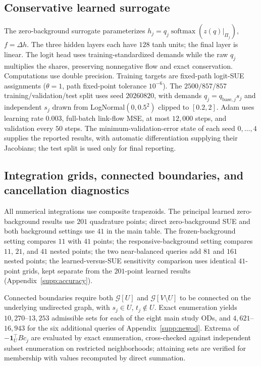 \subsection{Conservative learned surrogate}\label{supp:protocol}
The zero-background surrogate parameterizes
$h_j=q_j\operatorname{softmax}(z(q)|_{\Pi_j})$, $f=\Delta h$.
The three hidden layers each have $128$ tanh units; the final layer is
linear. The logit head uses training-standardized demands while the raw
$q_j$ multiplies the shares, preserving nonnegative flow and exact
conservation. Computations use double precision.
Training targets are fixed-path logit-SUE assignments ($\theta=1$,
path fixed-point tolerance $10^{-6}$). The $2500/857/857$
training/validation/test split uses seed $20260820$, with demands
$q_j=q_{\mathrm{base},j}s_j$ and independent $s_j$ drawn from
LogNormal$(0,0.5^2)$ clipped to $[0.2,2]$.
Adam uses learning rate $0.003$, full-batch link-flow MSE, at most
$12{,}000$ steps, and validation every $50$ steps. The
minimum-validation-error state of each seed $0,\ldots,4$ supplies
the reported results, with automatic differentiation supplying their
Jacobians; the test split is used only for final reporting.

\subsection{Integration grids, connected boundaries, and cancellation diagnostics}\label{supp:quadrature}
All numerical integrations use composite trapezoids. The principal
learned zero-background results use $201$ quadrature points; direct
zero-background SUE and both background settings use $41$ in the main
table. The frozen-background setting compares $11$ with $41$ points;
the responsive-background setting
compares $11$, $21$, and $41$ nested points; the two near-balanced
queries add $81$ and $161$ nested points; the learned-versus-SUE
sensitivity comparison uses identical $41$-point grids, kept separate
from the $201$-point learned results (Appendix~\ref{supp:accuracy}).

Connected boundaries require both $\mathcal G[U]$ and $\mathcal G[V\setminus U]$ to be
connected on the underlying undirected graph, with $s_j\in U$, $t_j\notin U$.
Exact enumeration yields $10{,}270$--$13{,}253$ admissible sets for each
of the eight main study ODs, and $4{,}621$--$16{,}943$ for the six
additional queries of Appendix~\ref{supp:newod}.
Extrema of $-\mathbf1_U^\top Bc_j$ are evaluated by exact
enumeration, cross-checked against independent subset enumeration on
restricted neighborhoods; attaining sets are verified for membership
with values recomputed by direct summation.

